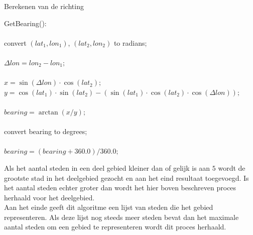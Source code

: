 \documentclass[twoside,openright]{uva-bachelor-thesis}
\begin{document}
			\begin{algorithm}
				\caption{Berekenen van de richting}
				\label{alg:bearing}
				\mbox{GetBearing():}\\[0.5cm]
				\mbox{}\\
				convert $(lat_1, lon_1)$, $(lat_2, lon_2)$ to radians;\\
				\mbox{}\\
				$\Delta lon = lon_2 - lon_1;$\\
				\mbox{}\\
				$x = \sin(\Delta lon) \cdot \cos(lat_2);$\\
				$y = \cos(lat_1) \cdot \sin(lat_2) - (\sin(lat_1) \cdot \cos(lat_2) \cdot \cos(\Delta lon));$\\
				\mbox{}\\
				$bearing = \arctan(x/y);$\\
				\mbox{}\\
				convert bearing to degrees;\\
				\mbox{}\\
				$bearing = (bearing + 360.0) / 360.0;$\\
			\end{algorithm}
			Als het aantal steden in een deel gebied kleiner dan of gelijk is aan $5$ wordt de grootste stad in het deelgebied gezocht en aan het eind resultaat toegevoegd. Is het aantal steden echter groter dan wordt het hier boven beschreven proces herhaald voor het deelgebied. \\[0.5cm]
			Aan het einde geeft dit algoritme een lijst van steden die het gebied representeren. Als deze lijst nog steeds meer steden bevat dan het maximale aantal steden om een gebied te representeren wordt dit proces herhaald.
\end{document}
